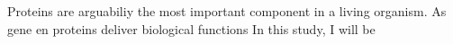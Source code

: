 Proteins are arguabiliy the most important component in a living organism. As gene en proteins deliver biological functions   In this study, I will be 